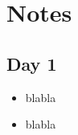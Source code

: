 \section{Notes}

\subsection{Day 1}

\begin{itemize}
    \item blabla
    \item blabla
\end{itemize}